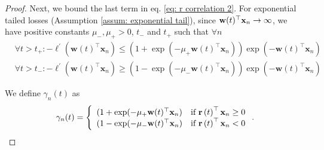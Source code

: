 \documentclass[twoside,11pt,english]{article}
\begin{document}
\begin{proof}
Next, we bound the last term in eq. \ref{eq: r correlation 2}. For exponential tailed losses (Assumption \ref{assum: exponential tail}), since $\mathbf{w}(t)^\top \mathbf{x}_{n}\to\infty$, we have positive constants $\mu_{-},\mu_{+}>0$,
$t_{-}$ and $t_{+}$ such that $\forall n$ 
\begin{align*}
 & \!\!\forall t>t_{+}:-\ell^{\prime}\left(\mathbf{w}\left(t\right)^{\top}\mathbf{x}_{n}\right)\leq\left(1+\exp\left(-\mu_{+}\mathbf{w}\left(t\right)^{\top}\mathbf{x}_{n}\right)\right)\exp\left(-\mathbf{w}\left(t\right)^{\top}\mathbf{x}_{n}\right)\\
 & \!\!\forall t>t_{-}:-\ell^{\prime}\left(\mathbf{w}\left(t\right)^{\top}\mathbf{x}_{n}\right)\geq\left(1-\exp\left(-\mu_{-}\mathbf{w}\left(t\right)^{\top}\mathbf{x}_{n}\right)\right)\exp\left(-\mathbf{w}\left(t\right)^{\top}\mathbf{x}_{n}\right)
\end{align*}

We define $\gamma_n(t)$ as \begin{equation}
\gamma_n(t)=\left\{\begin{array}{ll}(1+\exp(-\mu_+\mathbf{w}(t)^\top\mathbf{x}_{n}) & \text{if }\mathbf{r}\left(t\right)^\top\mathbf{x}_{n}\ge0\\ (1-\exp(-\mu_-\mathbf{w}(t)^\top\mathbf{x}_{n}) & \text{if }\mathbf{r}\left(t\right)^\top\mathbf{x}_{n}<0\end{array}\right..
\label{eq:gamma}
\end{equation}


\end{proof}
\end{document}
